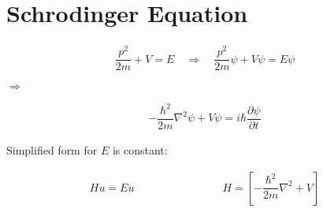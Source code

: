 \section{Schrodinger Equation}

\begin{equation*}
  \begin{aligned}
    \dfrac{p^2}{2 m} + V = E \quad \Rightarrow \quad \dfrac{p^2}{2 m} \psi + V \psi = E \psi
  \end{aligned}
\end{equation*}

$\Rightarrow$

\begin{equation}
  \begin{aligned}
    - \dfrac{\hbar^2}{2 m} \nabla^2 \psi + V \psi = i \hbar \dfrac{\partial \psi}{\partial t}  
  \end{aligned}
\end{equation}

Simplified form for $E$ is constant:

\begin{equation*}
  \begin{aligned}
    H u = E u
    \quad\quad \quad\quad \quad\quad \quad\quad 
    H = \left[ - \dfrac{\hbar^2}{2m} \nabla^2 + V  \right]
  \end{aligned}
\end{equation*}

